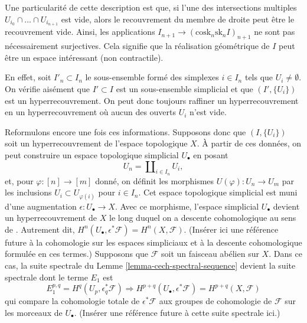 \begin{remark}
\label{remark-not-covering-set}
Une particularité de cette description est que, si l'une des intersections
multiples $U_{i_0} \cap \ldots \cap U_{i_{n + 1}}$ est vide, alors
le recouvrement du membre de droite peut être le recouvrement vide.
Ainsi, les applications
$I_{n + 1} \to (\text{cosk}_n\text{sk}_n I)_{n + 1}$ ne sont pas nécessairement surjectives.
Cela signifie que la réalisation géométrique de $I$ peut être un espace
intéressant (non contractile).

\medskip\noindent
En effet, soit $I'_n \subset I_n$ le sous-ensemble
formé des simplexes $i \in I_n$ tels que
$U_i \not = \emptyset$. On vérifie aisément que $I' \subset I$
est un sous-ensemble simplicial et que $(I', \{U_i\})$ est un hyperrecouvrement.
On peut donc toujours raffiner un hyperrecouvrement en un hyperrecouvrement où
aucun des ouverts $U_i$ n'est vide.
\end{remark}

\begin{remark}
\label{remark-repackage-into-simplicial-space}
Reformulons encore une fois ces informations.
Supposons donc que $(I, \{U_i\})$ soit un hyperrecouvrement de
l'espace topologique $X$. À partir de ces données, on peut construire
un espace topologique simplicial $U_\bullet$ en posant
$$
U_n = \coprod\nolimits_{i \in I_n} U_i,
$$
et, pour $\varphi : [n] \to [m]$ donné, on définit
les morphismes $U(\varphi) : U_n \to U_m$ par les
inclusions $U_i \subset U_{\varphi(i)}$
pour $i \in I_n$. Cet espace topologique simplicial est
muni d'une augmentation $\epsilon : U_\bullet \to X$.
Avec ce morphisme, l'espace simplicial $U_\bullet$ devient
un hyperrecouvrement de $X$ le long duquel on a descente cohomologique
au sens de \cite[Expos\'e Vbis]{SGA4}.
Autrement dit, $H^n(U_\bullet, \epsilon^*\mathcal{F}) = H^n(X, \mathcal{F})$.
(Insérer ici une référence future à la cohomologie sur les espaces
simpliciaux et à la descente cohomologique formulée en ces termes.)
Supposons que $\mathcal{F}$ soit un faisceau abélien sur $X$.
Dans ce cas, la suite spectrale du Lemme \ref{lemma-cech-spectral-sequence}
devient la suite spectrale dont le terme $E_1$ est
$$
E_1^{p, q} = H^q(U_p, \epsilon_q^*\mathcal{F})
\Rightarrow
H^{p + q}(U_\bullet, \epsilon^*\mathcal{F}) = H^{p + q}(X, \mathcal{F})
$$
qui compare la cohomologie totale de $\epsilon^*\mathcal{F}$
aux groupes de cohomologie de $\mathcal{F}$ sur les morceaux
de $U_\bullet$. (Insérer une référence future à cette suite spectrale
ici.)
\end{remark}

